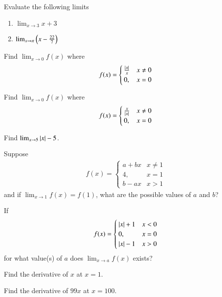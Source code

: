 \item Evaluate the following limits
\begin{enumerate}
\item $\lim_{x\to 3}x+3$
\item $\lim_{x\to \pi}\left(x-\frac{22}{7}\right)$
\end{enumerate}
%
\item Find $\lim_{x\to 0} f(x)$ where
\begin{align}
f(x) = 
\begin{cases}
\frac{\left\vert x\right\vert}{x} & x \ne 0
\\
0, & x = 0
\end{cases}
\end{align}
%
\item Find $\lim_{x\to 0} f(x)$ where
\begin{align}
f(x) = 
\begin{cases}
\frac{x}{\left\vert x\right\vert} & x \ne 0
\\
0, & x = 0
\end{cases}
\end{align}
%
\item Find $\lim_{x\to 5} \left\vert x\right\vert-5$.
%
\item Suppose
\begin{align}
f(x) = 
\begin{cases}
a+bx & x \ne 1
\\
4, & x = 1
\\
b-ax & x > 1
\end{cases}
\end{align}
%
and if $\lim_{x\to 1}f(x) = f(1)$, what are the possible values of $a$ and $b$?
%
\item If
\begin{align}
f(x) = 
\begin{cases}
\left\vert x\right\vert+1 & x < 0
\\
0, & x = 0
\\
\left\vert x\right\vert-1 & x > 0
\end{cases}
\end{align}
%
for what value(s) of $a$ does $\lim_{x\to a}f(x)$ exists?

\item Find the derivative of $x$ at $x = 1$.
\item Find the derivative of $99x$ at $x = 100$.

